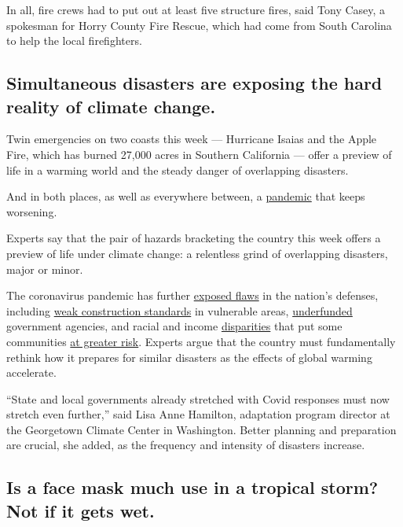 In all, fire crews had to put out at least five structure fires, said
Tony Casey, a spokesman for Horry County Fire Rescue, which had come
from South Carolina to help the local firefighters.

\hypertarget{simultaneous-disasters-are-exposing-the-hard-reality-of-climate-change}{%
\subsection{Simultaneous disasters are exposing the hard reality of
climate
change.}\label{simultaneous-disasters-are-exposing-the-hard-reality-of-climate-change}}

Twin emergencies on two coasts this week --- Hurricane Isaias and the
Apple Fire, which has burned 27,000 acres in Southern California ---
offer a preview of life in a warming world and the steady danger of
overlapping disasters.

And in both places, as well as everywhere between, a
\href{https://www.nytimes.com/interactive/2020/world/coronavirus-maps.html}{pandemic}
that keeps worsening.

Experts say that the pair of hazards bracketing the country this week
offers a preview of life under climate change: a relentless grind of
overlapping disasters, major or minor.

The coronavirus pandemic has further
\href{https://www.nytimes.com/2020/05/22/climate/fema-volunteer-disaster-response.html}{exposed
flaws} in the nation's defenses, including
\href{https://www.nytimes.com/2019/10/26/climate/building-codes-secret-deal.html}{weak
construction standards} in vulnerable areas,
\href{https://newrepublic.com/article/158486/towns-arent-equipped-handle-climate-emergencies}{underfunded}
government agencies, and racial and income
\href{https://www.nytimes.com/2020/05/17/climate/pollution-poverty-coronavirus.html}{disparities}
that put some communities
\href{https://www.nytimes.com/2020/07/24/climate/houston-flooding-race.html}{at
greater risk}. Experts argue that the country must fundamentally rethink
how it prepares for similar disasters as the effects of global warming
accelerate.

``State and local governments already stretched with Covid responses
must now stretch even further,'' said Lisa Anne Hamilton, adaptation
program director at the Georgetown Climate Center in Washington. Better
planning and preparation are crucial, she added, as the frequency and
intensity of disasters increase.

\hypertarget{is-a-face-mask-much-use-in-a-tropical-storm-not-if-it-gets-wet}{%
\subsection{Is a face mask much use in a tropical storm? Not if it gets
wet.}\label{is-a-face-mask-much-use-in-a-tropical-storm-not-if-it-gets-wet}}

